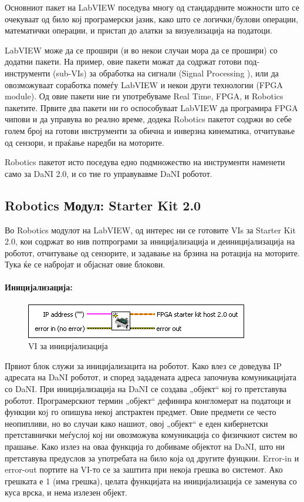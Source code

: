 \documentclass[12pt]{article}
\begin{document}
  Основниот пакет на LabVIEW поседува многу од стандардните можности што се очекуваат од било кој програмерски јазик, како што се логички/булови операции, математички операции, и пристап до алатки за визуелизација на податоци.

  LabVIEW може да се прошири (и во некои случаи мора да се прошири) со додатни пакети. На пример, овие пакети можат да содржат готови под-инструменти (sub-VIs) за обработка на сигнали (Signal Processing ), или да овозможуваат соработка помеѓу LabVIEW и некои други технологии (FPGA module). Од овие пакети ние ги употребуваме Real Time, FPGA, и Robotics пакетите. Првите два пакети ни го оспособуваат LabVIEW да програмира FPGA чипови и да управува во реално време, додека Robotics пакетот содржи во себе голем број на готови инструменти за обична и инверзна кинематика, отчитување од сензори, и праќање наредби на моторите.

  Robotics пакетот исто поседува едно подмножество на инструменти наменети само за DaNI 2.0, и со тие го управувавме DaNI роботот.

  \subsection{Robotics Модул: Starter Kit 2.0}
    Во Robotics модулот на LabVIEW, од интерес ни се готовите VIs за Starter Kit 2.0, кои содржат во нив потпрограми за иницијализација и деиницијализација на роботот, отчитување од сензорите, и задавање на брзина на ротација на моторите. Тука ќе се набројат и објаснат овие блокови.

		\paragraph{Иницијализација:\\}

			\begin{figure}[h]
				\includegraphics[width=0.45\linewidth]{./images/init.png}
				\raggedright
				\caption{VI за иницијализација}
				\label{fig:init.png}
				\end{figure}

		  Првиот блок служи за иницијализацита на роботот. Како влез се доведува IP адресата на DaNI роботот, и според зададената адреса започнува комуникацијата со DaNI. При иницијализација на DaNI се создава „објект“ кој го претставува роботот. Програмерскиот термин „објект“ дефинира конгломерат на податоци и функции коj го опишува некој апстрактен предмет. Овие предмети се често неопипливи, но во случаи како нашиот, овој „објект“ е еден кибернетски претставнички меѓуслој кој ни овозможува комуникација со физичкиот систем во прашање. Како излез на оваа функција го добиваме објектот на DaNI, што ни претставува предуслов за употребата на било која од другите фунцкии. Error-in и error-out портите на VI-то се за заштита при некоја грешка во системот. Ако грешката е 1 (има грешка), целата функцијата на иницијализација се заменува со куса врска, и нема излезен објект. \\
\end{document}
